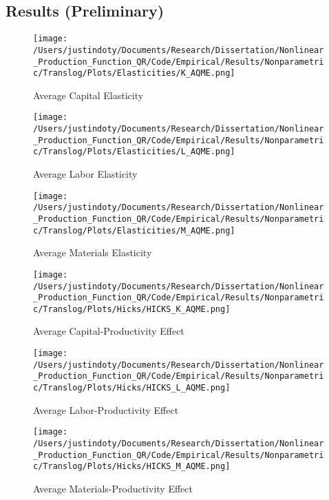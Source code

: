 \documentclass{article}
\begin{document}
\subsection{Results (Preliminary)}

\begin{figure}[H]
\centering
\caption{Average Capital Elasticity}
\texttt{[image: /Users/justindoty/Documents/Research/Dissertation/Nonlinear\_Production\_Function\_QR/Code/Empirical/Results/Nonparametric/Translog/Plots/Elasticities/K\_AQME.png]}
\label{kaqme}
\end{figure} 

\begin{figure}[H]
\centering
\caption{Average Labor Elasticity}
\texttt{[image: /Users/justindoty/Documents/Research/Dissertation/Nonlinear\_Production\_Function\_QR/Code/Empirical/Results/Nonparametric/Translog/Plots/Elasticities/L\_AQME.png]}
\label{laqme}
\end{figure} 

\begin{figure}[H]
\centering
\caption{Average Materials Elasticity}
\texttt{[image: /Users/justindoty/Documents/Research/Dissertation/Nonlinear\_Production\_Function\_QR/Code/Empirical/Results/Nonparametric/Translog/Plots/Elasticities/M\_AQME.png]}
\label{maqme}
\end{figure} 


\begin{figure}[H]
\centering
\caption{Average Capital-Productivity Effect}
\texttt{[image: /Users/justindoty/Documents/Research/Dissertation/Nonlinear\_Production\_Function\_QR/Code/Empirical/Results/Nonparametric/Translog/Plots/Hicks/HICKS\_K\_AQME.png]}
\label{hkaqme}
\end{figure} 

\begin{figure}[H]
\centering
\caption{Average Labor-Productivity Effect}
\texttt{[image: /Users/justindoty/Documents/Research/Dissertation/Nonlinear\_Production\_Function\_QR/Code/Empirical/Results/Nonparametric/Translog/Plots/Hicks/HICKS\_L\_AQME.png]}
\label{hlaqme}
\end{figure} 

\begin{figure}[H]
\centering
\caption{Average Materials-Productivity Effect}
\texttt{[image: /Users/justindoty/Documents/Research/Dissertation/Nonlinear\_Production\_Function\_QR/Code/Empirical/Results/Nonparametric/Translog/Plots/Hicks/HICKS\_M\_AQME.png]}
\label{hmaqme}
\end{figure} 
\end{document}
